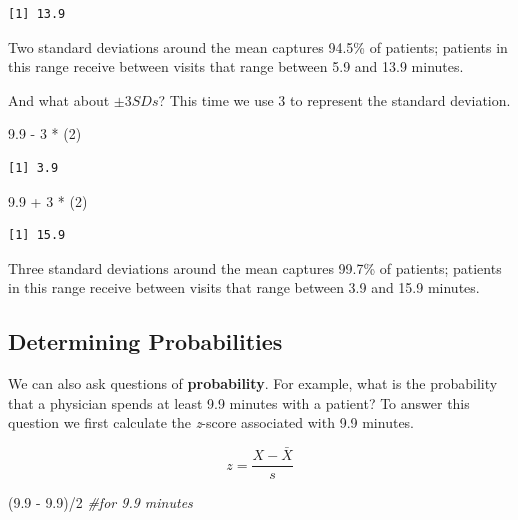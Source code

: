 \documentclass[
  11pt,
]{book}
\newenvironment{Shaded}{\begin{snugshade}}{\end{snugshade}}
\newcommand{\CommentTok}[1]{\textcolor[rgb]{0.56,0.35,0.01}{\textit{#1}}}
\newcommand{\DecValTok}[1]{\textcolor[rgb]{0.00,0.00,0.81}{#1}}
\newcommand{\FloatTok}[1]{\textcolor[rgb]{0.00,0.00,0.81}{#1}}
\newcommand{\NormalTok}[1]{#1}
\newcommand{\SpecialCharTok}[1]{\textcolor[rgb]{0.00,0.00,0.00}{#1}}
\begin{document}
\begin{verbatim}
[1] 13.9
\end{verbatim}

Two standard deviations around the mean captures 94.5\% of patients; patients in this range receive between visits that range between 5.9 and 13.9 minutes.

And what about \(\pm 3SDs\)? This time we use 3 to represent the standard deviation.

\begin{Shaded}
\begin{Highlighting}[]
\FloatTok{9.9} \SpecialCharTok{{-}} \DecValTok{3} \SpecialCharTok{*}\NormalTok{ (}\DecValTok{2}\NormalTok{)}
\end{Highlighting}
\end{Shaded}

\begin{verbatim}
[1] 3.9
\end{verbatim}

\begin{Shaded}
\begin{Highlighting}[]
\FloatTok{9.9} \SpecialCharTok{+} \DecValTok{3} \SpecialCharTok{*}\NormalTok{ (}\DecValTok{2}\NormalTok{)}
\end{Highlighting}
\end{Shaded}

\begin{verbatim}
[1] 15.9
\end{verbatim}

Three standard deviations around the mean captures 99.7\% of patients; patients in this range receive between visits that range between 3.9 and 15.9 minutes.

\hypertarget{determining-probabilities}{%
\subsection{Determining Probabilities}\label{determining-probabilities}}

We can also ask questions of \textbf{probability}. For example, what is the probability that a physician spends at least 9.9 minutes with a patient? To answer this question we first calculate the \emph{z}-score associated with 9.9 minutes.

\[z=\frac{X-\bar{X}}{s}\]

\begin{Shaded}
\begin{Highlighting}[]
\NormalTok{(}\FloatTok{9.9} \SpecialCharTok{{-}} \FloatTok{9.9}\NormalTok{)}\SpecialCharTok{/}\DecValTok{2}  \CommentTok{\#for 9.9 minutes}
\end{Highlighting}
\end{Shaded}
\end{document}
